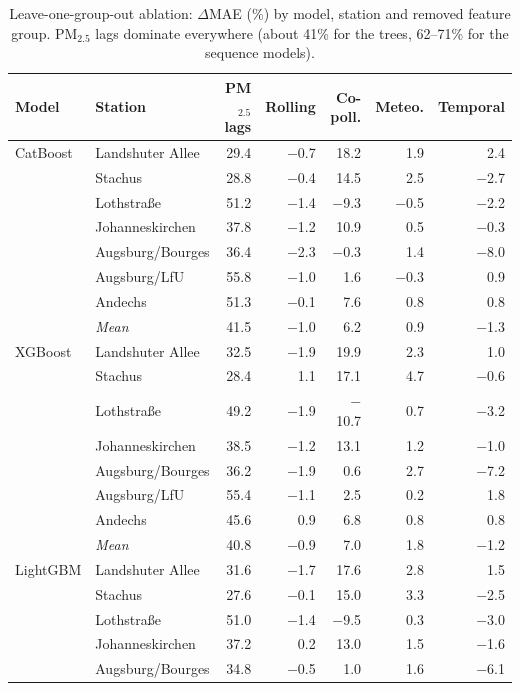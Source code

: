 \begin{table}[!htbp]
\centering\footnotesize\setlength{\tabcolsep}{4pt}
\caption{Leave-one-group-out ablation: $\Delta$MAE (\%) by model, station and removed feature group. PM$_{2.5}$ lags dominate everywhere (about 41\% for the trees, 62--71\% for the sequence models).}
\label{tab:app-rq1}
\begin{tabular}{llrrrrr}
\toprule
Model & Station & PM$_{2.5}$ lags & Rolling & Co-poll. & Meteo. & Temporal \\
\midrule
CatBoost & Landshuter Allee & 29.4 & $-$0.7 & 18.2 & 1.9 & 2.4 \\
 & Stachus & 28.8 & $-$0.4 & 14.5 & 2.5 & $-$2.7 \\
 & Lothstra{\ss}e & 51.2 & $-$1.4 & $-$9.3 & $-$0.5 & $-$2.2 \\
 & Johanneskirchen & 37.8 & $-$1.2 & 10.9 & 0.5 & $-$0.3 \\
 & Augsburg/Bourges & 36.4 & $-$2.3 & $-$0.3 & 1.4 & $-$8.0 \\
 & Augsburg/LfU & 55.8 & $-$1.0 & 1.6 & $-$0.3 & 0.9 \\
 & Andechs & 51.3 & $-$0.1 & 7.6 & 0.8 & 0.8 \\
 & \textit{Mean} & 41.5 & $-$1.0 & 6.2 & 0.9 & $-$1.3 \\
\midrule
XGBoost & Landshuter Allee & 32.5 & $-$1.9 & 19.9 & 2.3 & 1.0 \\
 & Stachus & 28.4 & 1.1 & 17.1 & 4.7 & $-$0.6 \\
 & Lothstra{\ss}e & 49.2 & $-$1.9 & $-$10.7 & 0.7 & $-$3.2 \\
 & Johanneskirchen & 38.5 & $-$1.2 & 13.1 & 1.2 & $-$1.0 \\
 & Augsburg/Bourges & 36.2 & $-$1.9 & 0.6 & 2.7 & $-$7.2 \\
 & Augsburg/LfU & 55.4 & $-$1.1 & 2.5 & 0.2 & 1.8 \\
 & Andechs & 45.6 & 0.9 & 6.8 & 0.8 & 0.8 \\
 & \textit{Mean} & 40.8 & $-$0.9 & 7.0 & 1.8 & $-$1.2 \\
\midrule
LightGBM & Landshuter Allee & 31.6 & $-$1.7 & 17.6 & 2.8 & 1.5 \\
 & Stachus & 27.6 & $-$0.1 & 15.0 & 3.3 & $-$2.5 \\
 & Lothstra{\ss}e & 51.0 & $-$1.4 & $-$9.5 & 0.3 & $-$3.0 \\
 & Johanneskirchen & 37.2 & 0.2 & 13.0 & 1.5 & $-$1.6 \\
 & Augsburg/Bourges & 34.8 & $-$0.5 & 1.0 & 1.6 & $-$6.1 \\

\end{tabular}
\end{table}
